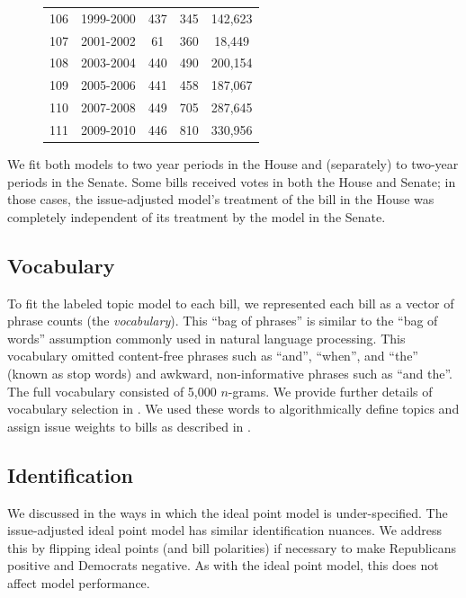 \begin{figure}
\begin{small}
\begin{tabular}{ccccc}
    \hline
    106 & 1999-2000 & 437 & 345 & 142,623 \\
    107 & 2001-2002 & 61 & 360 & 18,449 \\
    108 & 2003-2004 & 440 & 490 & 200,154 \\
    109 & 2005-2006 & 441 & 458 & 187,067 \\
    110 & 2007-2008 & 449 & 705 & 287,645 \\
    111 & 2009-2010 & 446 & 810 & 330,956 \\
    \hline
  \end{tabular}
  \end{small}
  \label{fig:data_stats}
\end{figure}


We fit both models to two year periods in the House and (separately)
to two-year periods in the Senate.  Some bills received votes in both
the House and Senate; in those cases, the issue-adjusted model's
treatment of the bill in the House was completely independent of its
treatment by the model in the Senate.

\subsection*{Vocabulary}
To fit the labeled topic model to each bill, we represented each bill
as a vector of phrase counts (the \emph{vocabulary}).  This ``bag of
phrases'' is similar to the ``bag of words'' assumption commonly used
in natural language processing.  This vocabulary omitted content-free
phrases such as ``and'', ``when'', and ``the'' (known as stop words)
and awkward, non-informative phrases such as ``and the''.  The full
vocabulary consisted of 5,000 $n$-grams. We provide further details of
vocabulary selection in .  We used these
words to algorithmically define topics and assign issue weights to
bills as described in .

\subsection*{Identification}
We discussed in  the ways in which the ideal
point model is under-specified.  The issue-adjusted ideal point model
has similar identification nuances.  We address this by flipping ideal
points (and bill polarities) if necessary to make Republicans positive
and Democrats negative.  As with the ideal point model, this does not
affect model performance.

